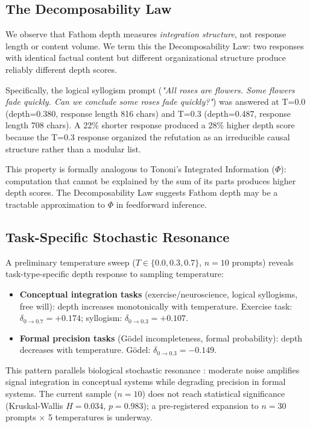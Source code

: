\documentclass[10pt]{article}
\begin{document}
\subsection{The Decomposability Law}
\label{sec:decomposability}

We observe that Fathom depth measures \emph{integration structure}, not response length or content volume. We term this the Decomposability Law: two responses with identical factual content but different organizational structure produce reliably different depth scores.

Specifically, the logical syllogism prompt (\emph{"All roses are flowers. Some flowers fade quickly. Can we conclude some roses fade quickly?"}) was answered at T=0.0 (depth=0.380, response length 816 chars) and T=0.3 (depth=0.487, response length 708 chars). A 22\% shorter response produced a 28\% higher depth score because the T=0.3 response organized the refutation as an irreducible causal structure rather than a modular list.

This property is formally analogous to Tononi's Integrated Information ($\Phi$): computation that cannot be explained by the sum of its parts produces higher depth scores. The Decomposability Law suggests Fathom depth may be a tractable approximation to $\Phi$ in feedforward inference.

\subsection{Task-Specific Stochastic Resonance}
\label{sec:stochastic}

A preliminary temperature sweep ($T \in \{0.0, 0.3, 0.7\}$, $n=10$ prompts) reveals task-type-specific depth response to sampling temperature:

\begin{itemize}
\item \textbf{Conceptual integration tasks} (exercise/neuroscience, logical syllogisms, free will): depth increases monotonically with temperature. Exercise task: $\delta_{0\to0.7}=+0.174$; syllogism: $\delta_{0\to0.3}=+0.107$.
\item \textbf{Formal precision tasks} (Gödel incompleteness, formal probability): depth decreases with temperature. Gödel: $\delta_{0\to0.3}=-0.149$.
\end{itemize}

This pattern parallels biological stochastic resonance \citep{wiesenfeld1995stochastic}: moderate noise amplifies signal integration in conceptual systems while degrading precision in formal systems. The current sample ($n=10$) does not reach statistical significance (Kruskal-Wallis $H=0.034$, $p=0.983$); a pre-registered expansion to $n=30$ prompts $\times$ 5 temperatures is underway.
\end{document}
